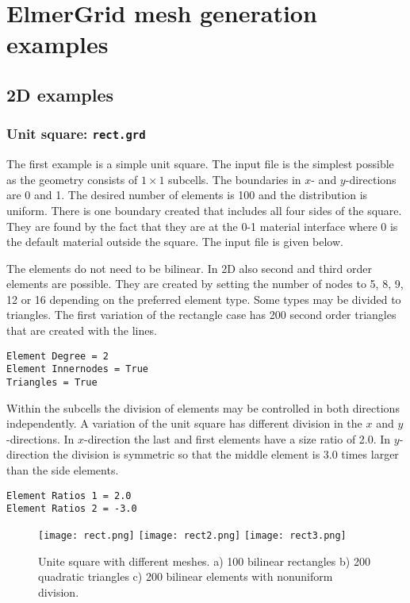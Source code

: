 \chapter{ElmerGrid mesh generation examples}


\section{2D examples}

\subsection*{Unit square: \texttt{rect.grd}}

The first example is a simple unit square. The input file is the simplest
possible as the geometry consists of $1 \times 1$ subcells.
The boundaries in $x$- and $y$-directions are 0 and 1.
The desired number of elements is 100 and the distribution is uniform.
There is one boundary created that includes all four sides of the 
square. They are found by the fact that they are at the 0-1 material interface
where 0 is the default material outside the square. 
The input file is given below.
%

%
The elements do not need to be bilinear. In 2D also 
second and third order elements are possible. They are created by
setting the number of nodes to 5, 8, 9, 12 or 16 depending on the
preferred element type. Some types may be divided to triangles.
The first variation of the rectangle case has 200 second order 
triangles that are created with the lines. 
%
\begin{verbatim}
Element Degree = 2
Element Innernodes = True
Triangles = True
\end{verbatim}

\noindent
Within the subcells the division of elements may be controlled in both 
directions independently. A variation of the unit square has different
division in the $x$ and $y$-directions. In $x$-direction the
last and first elements have a size ratio of 2.0.
In $y$-direction the division is symmetric so that the middle element
is 3.0 times larger than the side elements.
\begin{verbatim}
Element Ratios 1 = 2.0
Element Ratios 2 = -3.0
\end{verbatim}

\begin{figure}
\begin{center}
\texttt{[image: rect.png]}
\texttt{[image: rect2.png]}
\texttt{[image: rect3.png]}
\end{center}
\caption{Unite square with different meshes. a) 100 bilinear rectangles
b) 200 quadratic triangles c) 200 bilinear elements with nonuniform 
division.}
\label{pic1}
\end{figure}

